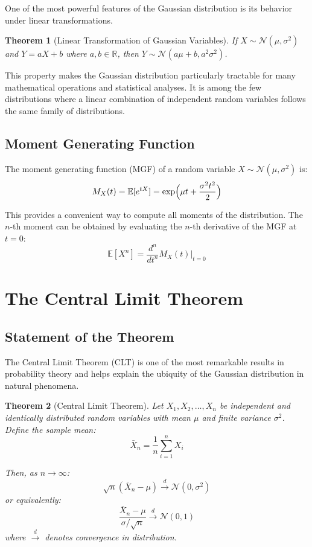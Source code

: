 \documentclass{article}
\newtheorem{theorem}{Theorem}
\begin{document}
One of the most powerful features of the Gaussian distribution is its behavior under linear transformations.

\begin{theorem}[Linear Transformation of Gaussian Variables]
If $X \sim \mathcal{N}(\mu, \sigma^2)$ and $Y = aX + b$ where $a, b \in \mathbb{R}$, then $Y \sim \mathcal{N}(a\mu + b, a^2\sigma^2)$.
\end{theorem}

This property makes the Gaussian distribution particularly tractable for many mathematical operations and statistical analyses. It is among the few distributions where a linear combination of independent random variables follows the same family of distributions.

\subsection{Moment Generating Function}

The moment generating function (MGF) of a random variable $X \sim \mathcal{N}(\mu, \sigma^2)$ is:
\[
M_X(t) = \mathbb{E}[e^{tX}] = \exp\Bigl(\mu t + \frac{\sigma^2 t^2}{2}\Bigr)
\]

This provides a convenient way to compute all moments of the distribution. The $n$-th moment can be obtained by evaluating the $n$-th derivative of the MGF at $t = 0$:
\[
\mathbb{E}[X^n] = \frac{d^n}{dt^n}M_X(t) \Big|_{t=0}
\]

\section{The Central Limit Theorem}

\subsection{Statement of the Theorem}

The Central Limit Theorem (CLT) is one of the most remarkable results in probability theory and helps explain the ubiquity of the Gaussian distribution in natural phenomena.

\begin{theorem}[Central Limit Theorem]
Let $X_1, X_2, \ldots, X_n$ be independent and identically distributed random variables with mean $\mu$ and finite variance $\sigma^2$. Define the sample mean:
\[
\bar{X}_n = \frac{1}{n} \sum_{i=1}^{n} X_i
\]

Then, as $n \to \infty$:
\[
\sqrt{n}(\bar{X}_n - \mu) \stackrel{d}{\to} \mathcal{N}(0, \sigma^2)
\]
or equivalently:
\[
\frac{\bar{X}_n - \mu}{\sigma/\sqrt{n}} \stackrel{d}{\to} \mathcal{N}(0, 1)
\]
where $\stackrel{d}{\to}$ denotes convergence in distribution.
\end{theorem}
\end{document}

